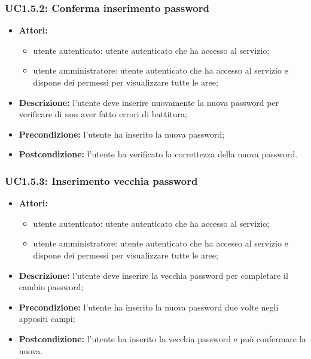 \subsubsection{UC1.5.2: Conferma inserimento password }

\begin{itemize}
   	\item \textbf{Attori:}
    \begin{itemize}
    	\item utente autenticato: utente autenticato che ha accesso al servizio;
    	\item utente amministratore: utente autenticato che ha accesso al servizio e dispone dei permessi per visualizzare tutte le aree;
	\end{itemize}
    \item \textbf{Descrizione:} l'utente deve inserire nuovamente la nuova password per verificare di non aver fatto errori di battitura;
    \item \textbf{Precondizione:} l'utente ha inserito la nuova password;
    \item \textbf{Postcondizione:} l'utente ha verificato la correttezza della nuova password.
\end{itemize}

\subsubsection{UC1.5.3: Inserimento vecchia password}

\begin{itemize}
    	\item \textbf{Attori:}
    \begin{itemize}
    	\item utente autenticato: utente autenticato che ha accesso al servizio;
    	\item utente amministratore: utente autenticato che ha accesso al servizio e dispone dei permessi per visualizzare tutte le aree;
	\end{itemize}
    \item \textbf{Descrizione:} l'utente deve inserire la vecchia password per completare il cambio password;
    \item \textbf{Precondizione:} l'utente ha inserito la nuova password due volte negli appositi campi;
    \item \textbf{Postcondizione:} l'utente ha inserito la vecchia password e può confermare la nuova.
\end{itemize}

